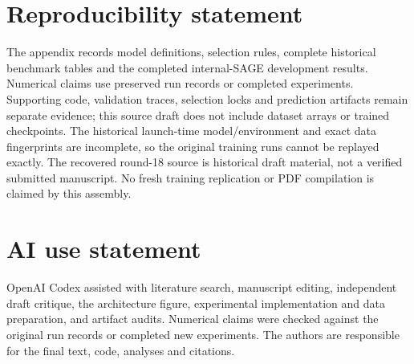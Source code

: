 \documentclass{article}
\begin{document}
\section*{Reproducibility statement}
The appendix records model definitions, selection rules, complete historical benchmark tables and the completed internal-SAGE development results. Numerical claims use preserved run records or completed experiments. Supporting code, validation traces, selection locks and prediction artifacts remain separate evidence; this source draft does not include dataset arrays or trained checkpoints. The historical launch-time model/environment and exact data fingerprints are incomplete, so the original training runs cannot be replayed exactly. The recovered round-18 source is historical draft material, not a verified submitted manuscript. No fresh training replication or PDF compilation is claimed by this assembly.

\section*{AI use statement}
OpenAI Codex assisted with literature search, manuscript editing, independent draft critique, the architecture figure, experimental implementation and data preparation, and artifact audits. Numerical claims were checked against the original run records or completed new experiments. The authors are responsible for the final text, code, analyses and citations.



\clearpage
\appendix
\renewcommand{\thesection}{A\arabic{section}}
\renewcommand{\theHsection}{appendix.\arabic{section}}
\renewcommand{\thefootnote}{\arabic{footnote}}

\end{document}

